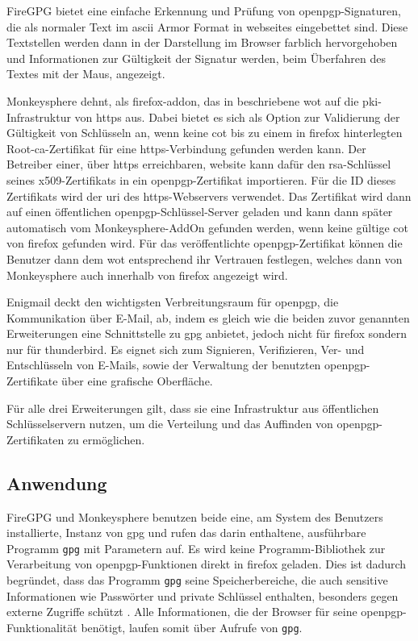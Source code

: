 FireGPG bietet eine einfache Erkennung und Prüfung von \gls{openpgp}-Signaturen, die als normaler Text im \gls{ascii} Armor Format \cite{openpgp:ietf} in
\glspl{webseite} eingebettet sind. Diese Textstellen werden dann in der Darstellung im Browser farblich hervorgehoben und Informationen zur Gültigkeit der
Signatur werden, beim Überfahren des Textes mit der Maus, angezeigt.

Monkeysphere dehnt, als \gls{firefox-addon}, das in  beschriebene \gls{wot} auf die \gls{pki}-Infrastruktur von
\gls{https} aus. Dabei bietet es sich als Option zur Validierung der Gültigkeit von Schlüsseln an, wenn keine \gls{cot} bis zu einem in \gls{firefox}
hinterlegten Root-\gls{ca}-Zertifikat für eine \gls{https}-Verbindung gefunden werden kann. Der Betreiber einer, über \gls{https} erreichbaren, \gls{website} kann
dafür den \gls{rsa}-Schlüssel seines \gls{x509}-Zertifikats in ein \gls{openpgp}-Zertifikat importieren. Für die ID dieses Zertifikats wird der
\gls{uri} des \gls{https}-Webservers verwendet. Das Zertifikat wird dann auf einen öffentlichen \gls{openpgp}-Schlüssel-Server geladen und kann dann später
automatisch vom Monkeysphere-AddOn gefunden werden, wenn keine gültige \gls{cot} von \gls{firefox} gefunden wird. Für das veröffentlichte
\gls{openpgp}-Zertifikat können die Benutzer dann dem \gls{wot} entsprechend ihr Vertrauen festlegen, welches dann von Monkeysphere auch innerhalb von
\gls{firefox} angezeigt wird.

Enigmail deckt den wichtigsten Verbreitungsraum für \gls{openpgp}, die Kommunikation über E-Mail, ab, indem es gleich wie die beiden zuvor genannten
Erweiterungen eine Schnittstelle zu \gls{gpg} anbietet, jedoch nicht für \gls{firefox} sondern nur für \gls{thunderbird}. Es eignet sich zum Signieren,
Verifizieren, Ver- und Entschlüsseln von E-Mails, sowie der Verwaltung der benutzten \gls{openpgp}-Zertifikate über eine grafische Oberfläche.

Für alle drei Erweiterungen gilt, dass sie eine Infrastruktur aus öffentlichen Schlüsselservern nutzen, um die Verteilung und das Auffinden von
\gls{openpgp}-Zertifikaten zu ermöglichen.

\subsection{Anwendung}
FireGPG und Monkeysphere benutzen beide eine, am System des Benutzers installierte, Instanz von \gls{gpg} und rufen das darin enthaltene, ausführbare Programm
\texttt{gpg} mit Parametern auf. Es wird keine Programm-Bibliothek zur Verarbeitung von \gls{openpgp}-Funktionen direkt in \gls{firefox} geladen. Dies ist dadurch
begründet, dass das Programm \texttt{gpg} seine Speicherbereiche, die auch sensitive Informationen wie Passwörter und private Schlüssel enthalten, besonders
gegen externe Zugriffe schützt \cite{pgp}. Alle Informationen, die der Browser für seine \gls{openpgp}-Funktionalität benötigt, laufen somit über Aufrufe von
\texttt{gpg}.

